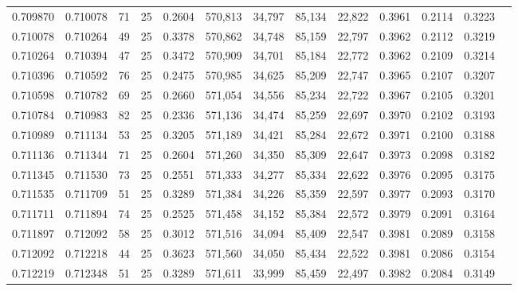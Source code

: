\begin{tabular}{rrrrrrrrrrrrr}
0.709870 & 0.710078 &    71 &  25 &                                     0.2604 & 570,813 &  34,797 &  85,134 &  22,822 & 0.3961 & 0.2114 & 0.3223 \\
0.710078 & 0.710264 &    49 &  25 &                                     0.3378 & 570,862 &  34,748 &  85,159 &  22,797 & 0.3962 & 0.2112 & 0.3219 \\
0.710264 & 0.710394 &    47 &  25 &                                     0.3472 & 570,909 &  34,701 &  85,184 &  22,772 & 0.3962 & 0.2109 & 0.3214 \\
0.710396 & 0.710592 &    76 &  25 &                                     0.2475 & 570,985 &  34,625 &  85,209 &  22,747 & 0.3965 & 0.2107 & 0.3207 \\
0.710598 & 0.710782 &    69 &  25 &                                     0.2660 & 571,054 &  34,556 &  85,234 &  22,722 & 0.3967 & 0.2105 & 0.3201 \\
0.710784 & 0.710983 &    82 &  25 &                                     0.2336 & 571,136 &  34,474 &  85,259 &  22,697 & 0.3970 & 0.2102 & 0.3193 \\
0.710989 & 0.711134 &    53 &  25 &                                     0.3205 & 571,189 &  34,421 &  85,284 &  22,672 & 0.3971 & 0.2100 & 0.3188 \\
0.711136 & 0.711344 &    71 &  25 &                                     0.2604 & 571,260 &  34,350 &  85,309 &  22,647 & 0.3973 & 0.2098 & 0.3182 \\
0.711345 & 0.711530 &    73 &  25 &                                     0.2551 & 571,333 &  34,277 &  85,334 &  22,622 & 0.3976 & 0.2095 & 0.3175 \\
0.711535 & 0.711709 &    51 &  25 &                                     0.3289 & 571,384 &  34,226 &  85,359 &  22,597 & 0.3977 & 0.2093 & 0.3170 \\
0.711711 & 0.711894 &    74 &  25 &                                     0.2525 & 571,458 &  34,152 &  85,384 &  22,572 & 0.3979 & 0.2091 & 0.3164 \\
0.711897 & 0.712092 &    58 &  25 &                                     0.3012 & 571,516 &  34,094 &  85,409 &  22,547 & 0.3981 & 0.2089 & 0.3158 \\
0.712092 & 0.712218 &    44 &  25 &                                     0.3623 & 571,560 &  34,050 &  85,434 &  22,522 & 0.3981 & 0.2086 & 0.3154 \\
0.712219 & 0.712348 &    51 &  25 &                                     0.3289 & 571,611 &  33,999 &  85,459 &  22,497 & 0.3982 & 0.2084 & 0.3149 \\

\end{tabular}
